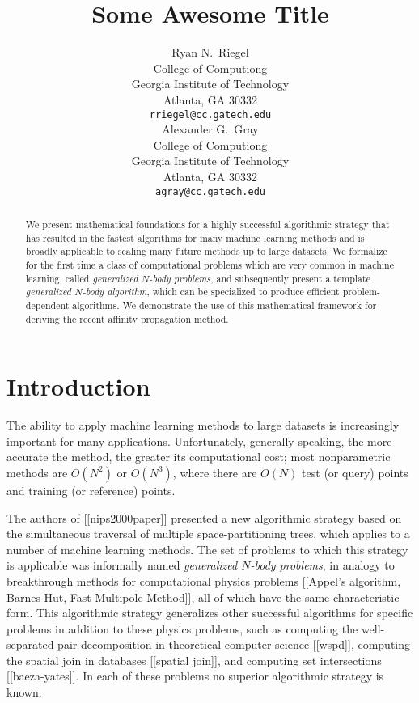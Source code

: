 \documentclass{article}
\title{Some Awesome Title}
\author{
Ryan N.~Riegel \\
College of Computiong \\
Georgia Institute of Technology \\
Atlanta, GA 30332 \\
\texttt{rriegel@cc.gatech.edu} \\
\And
Alexander G.~Gray \\
College of Computiong \\
Georgia Institute of Technology \\
Atlanta, GA 30332 \\
\texttt{agray@cc.gatech.edu} \\
}
\begin{document}
\makeanontitle

\begin{abstract}
We present mathematical foundations for a highly successful
algorithmic strategy that has resulted in the fastest algorithms for
many machine learning methods and is broadly applicable to scaling
many future methods up to large datasets.  We formalize for the first
time a class of computational problems which are very common in
machine learning, called {\em generalized $N$-body problems}, and
subsequently present a template {\em generalized $N$-body algorithm},
which can be specialized to produce efficient problem-dependent
algorithms.  We demonstrate the use of this mathematical framework for
deriving the recent affinity propagation method.
\end{abstract}

\section{Introduction}

The ability to apply machine learning methods to large datasets is
increasingly important for many applications.  Unfortunately,
generally speaking, the more accurate the method, the greater its
computational cost; most nonparametric methods are $O(N^2)$ or
$O(N^3)$, where there are $O(N)$ test (or query) points and training
(or reference) points.

The authors of [[nips2000paper]] presented a new algorithmic strategy
based on the simultaneous traversal of multiple space-partitioning
trees, which applies to a number of machine learning methods.  The set
of problems to which this strategy is applicable was informally named
{\em generalized $N$-body problems}, in analogy to breakthrough
methods for computational physics problems [[Appel's algorithm,
Barnes-Hut, Fast Multipole Method]], all of which have the same
characteristic form.  This algorithmic strategy generalizes other
successful algorithms for specific problems in addition to these
physics problems, such as computing the well-separated pair
decomposition in theoretical computer science [[wspd]], computing the
spatial join in databases [[spatial join]], and computing set
intersections [[baeza-yates]].  In each of these problems no superior
algorithmic strategy is known.
\end{document}
